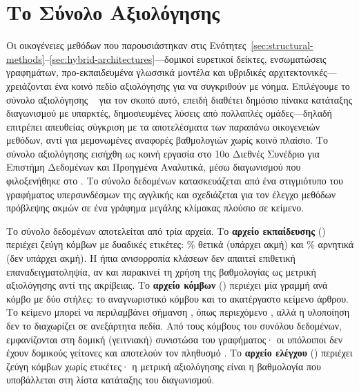 \section{Το Σύνολο Αξιολόγησης }
\label{sec:dsaa-dataset}

Οι οικογένειες μεθόδων που παρουσιάστηκαν στις Ενότητες~\ref{sec:structural-methods}--\ref{sec:hybrid-architectures}---δομικοί ευρετικοί δείκτες, ενσωματώσεις γραφημάτων,
προ-εκπαιδευμένα γλωσσικά μοντέλα και υβριδικές αρχιτεκτονικές---χρειάζονται ένα
κοινό πεδίο αξιολόγησης για να συγκριθούν με νόημα.
Επιλέγουμε το σύνολο αξιολόγησης ~\cite{phan2023link,dsaa-2023-competition} για τον σκοπό αυτό, επειδή διαθέτει
δημόσιο πίνακα κατάταξης διαγωνισμού με υπαρκτές, δημοσιευμένες λύσεις από
πολλαπλές ομάδες---δηλαδή επιτρέπει απευθείας σύγκριση με τα αποτελέσματα των
παραπάνω οικογενειών μεθόδων, αντί για μεμονωμένες αναφορές βαθμολογιών χωρίς
κοινό πλαίσιο.
Το σύνολο αξιολόγησης εισήχθη ως κοινή εργασία στο 10ο Διεθνές
Συνέδριο  για Επιστήμη Δεδομένων και Προηγμένα Αναλυτικά, μέσω
διαγωνισμού που φιλοξενήθηκε στο .
Το σύνολο δεδομένων κατασκευάζεται από ένα στιγμιότυπο του γραφήματος
υπερσυνδέσμων της αγγλικής  και σχεδιάζεται για τον έλεγχο μεθόδων
πρόβλεψης ακμών σε ένα γράφημα μεγάλης κλίμακας πλούσιο σε κείμενο.

Το σύνολο δεδομένων αποτελείται από τρία αρχεία.
Το \textbf{αρχείο εκπαίδευσης}
(\texttt{}) περιέχει \TrainPairs{} ζεύγη κόμβων με δυαδικές ετικέτες: \TrainPosPct\%
θετικά (υπάρχει ακμή) και \TrainNegPct\% αρνητικά (δεν υπάρχει ακμή).
Η ήπια ανισορροπία
κλάσεων δεν απαιτεί επιθετική επαναδειγματοληψία, αν και παρακινεί τη χρήση της
βαθμολογίας  ως μετρική αξιολόγησης αντί της ακρίβειας.
Το \textbf{αρχείο
κόμβων} (\texttt{}) περιέχει μία γραμμή ανά κόμβο  με
δύο στήλες: το αναγνωριστικό κόμβου και το ακατέργαστο κείμενο άρθρου.
Το κείμενο
μπορεί να περιλαμβάνει σήμανση , όπως περιεχόμενο , αλλά
η υλοποίηση δεν το διαχωρίζει σε ανεξάρτητα πεδία.
Από τους \GraphNodesTotal{} κόμβους του συνόλου δεδομένων, \GraphNodes{}
εμφανίζονται στη δομική (γειτνιακή) συνιστώσα του γραφήματος· οι υπόλοιποι δεν έχουν
δομικούς γείτονες και αποτελούν τον πληθυσμό .
Το
\textbf{αρχείο ελέγχου} (\texttt{}) περιέχει \TestPairs{} ζεύγη κόμβων χωρίς
ετικέτες· η μετρική αξιολόγησης είναι η βαθμολογία  που υποβάλλεται
στη λίστα κατάταξης του διαγωνισμού.


